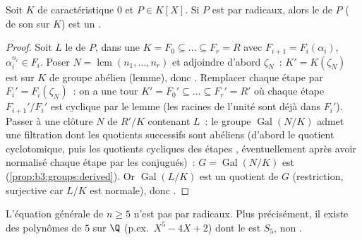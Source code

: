 \begin{theorem}\label{thm:b3:galois:solvable}
Soit $K$ de caractéristique $0$ et $P \in K[X]$. Si $P$ est
 par radicaux, alors le  de $P$
( de son  sur $K$) est un
.
\end{theorem}

\begin{proof}
Soit $L$ le  de $P$,  dans une
 $K = F_0 \subseteq \dots \subseteq F_r = R$
avec $F_{i+1} = F_i(\alpha_i)$, $\alpha_i^{n_i} \in F_i$. Poser
$N = \operatorname{lcm}(n_1, \dots, n_r)$ et adjoindre
d'abord $\zeta_N$~: $K' = K(\zeta_N)$ est  sur $K$
de groupe abélien (lemme), donc . Remplacer chaque
étape par $F_i' = F_i(\zeta_N)$~: on a une tour $K' =
F_0' \subseteq \dots \subseteq F_r' = R'$ où chaque étape
$F_{i+1}'/F_i'$ est cyclique par le lemme (les racines de
l'unité sont déjà dans $F_i'$). Passer à une clôture
 $N$ de $R'/K$ contenant $L$~: le groupe
$\operatorname{Gal}(N/K)$ admet une filtration dont les
quotients successifs sont abéliens (d'abord le quotient
cyclotomique, puis les quotients cycliques des étapes
, éventuellement après avoir normalisé chaque étape
par les conjugués)~: $G = \operatorname{Gal}(N/K)$ est
 (\cref{prop:b3:groups:derived}). Or
$\operatorname{Gal}(L/K)$ est un quotient de $G$ (restriction,
surjective car $L/K$ est normale), donc .
\end{proof}

\begin{corollary}\label{cor:b3:galois:quintic}
L'équation générale de  $n \geq 5$ n'est pas  par
radicaux. Plus précisément, il existe des polynômes de 
$5$ sur $\Q$ (p.ex.\ $X^5 - 4X + 2$) dont le 
est $S_5$, non .
\end{corollary}

